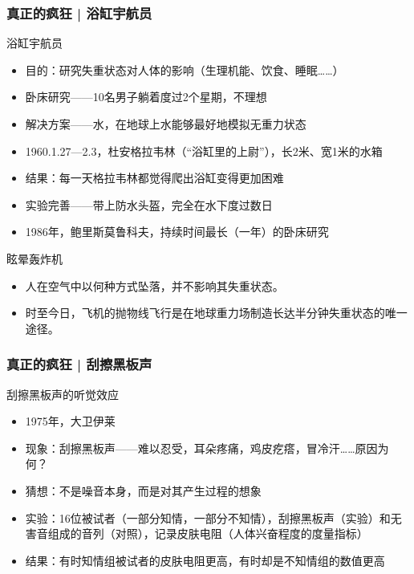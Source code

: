 \begin{frame}
  \frametitle{真正的疯狂 | 浴缸宇航员}
  \begin{block}{浴缸宇航员}
    \begin{itemize}
      \item 目的：研究失重状态对人体的影响（生理机能、饮食、睡眠……）
    \pause
      \item 卧床研究——10名男子躺着度过2个星期，不理想
      \item 解决方案——水，在地球上水能够最好地模拟无重力状态
      \item 1960.1.27—2.3，杜安\textbullet 格拉韦林（“浴缸里的上尉”），长2米、宽1米的水箱
      \item 结果：每一天格拉韦林都觉得爬出浴缸变得更加困难
      \item 实验完善——带上防水头盔，完全在水下度过数日
      \item 1986年，鲍里斯\textbullet 莫鲁科夫，持续时间最长（一年）的卧床研究
    \end{itemize}
  \end{block}
  \pause
  \begin{block}{眩晕轰炸机}
    \begin{itemize}
      \item 人在空气中以何种方式坠落，并不影响其失重状态。
      \item 时至今日，飞机的抛物线飞行是在地球重力场制造长达半分钟失重状态的唯一途径。
    \end{itemize}
  \end{block}
\end{frame}

\begin{frame}
  \frametitle{真正的疯狂 | 刮擦黑板声}
  \begin{block}{刮擦黑板声的听觉效应}
    \begin{itemize}
      \item 1975年，大卫\textbullet 伊莱
      \item 现象：刮擦黑板声——难以忍受，耳朵疼痛，鸡皮疙瘩，冒冷汗……原因为何？
    \pause
      \item 猜想：不是噪音本身，而是对其产生过程的想象
      \item 实验：16位被试者（一部分知情，一部分不知情），刮擦黑板声（实验）和无害音组成的音列（对照），记录皮肤电阻（人体兴奋程度的度量指标）
      \item 结果：有时知情组被试者的皮肤电阻更高，有时却是不知情组的数值更高
    \end{itemize}
  \end{block}
\end{frame}

